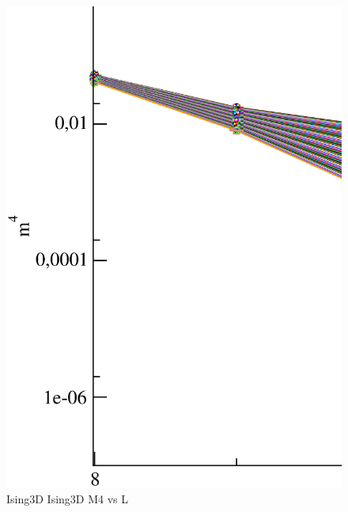 \begin{figure}[!htpb]
  \centering
  \includegraphics[width=\textwidth]{./plots/Ising3D/Ising3D_M4_vs_L.eps}
  \caption{Ising3D Ising3D M4 vs L}
\end{figure}

